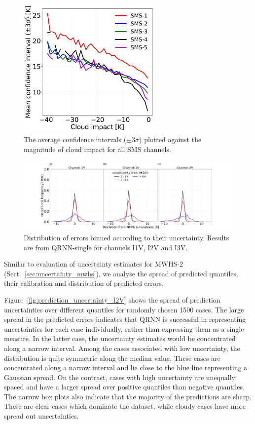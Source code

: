\documentclass[amt, manuscript]{copernicus}
\begin{document}
\begin{figure}[t]
	\includegraphics[width = 70mm]{Figures/fig12.pdf}	
	\caption{The average confidence intervals ($\pm3\sigma$) plotted against the magnitude of cloud impact for all SMS channels.}
	\label{fig:uncertainty_cloud_impact}	
\end{figure}
\begin{figure}[t]
	\includegraphics[width=\textwidth]{Figures/fig13.pdf}	
	\caption{Distribution of errors binned according to their uncertainty. Results are from QRNN-single for channels I1V, I2V and I3V.}
	\label{fig:error_distribution_uncertainty_bins}	
\end{figure}

Similar to evaluation of uncertainty estimates for MWHS-2 (Sect.~\ref{sec:uncertainty_mwhs}), we analyse the spread of predicted quantiles, their calibration and distribution of predicted errors. 

Figure~\ref{fig:prediction_uncertainty_I2V} shows the spread of prediction uncertainties over different quantiles for randomly chosen 1500 cases. The large spread in the predicted errors indicates that QRNN is successful in representing uncertainties for each case individually, rather than expressing them as a single measure. In the latter case, the uncertainty estimates would be concentrated along a narrow interval. Among the cases associated with low uncertainty, the distribution is quite symmetric along the median value. These cases are concentrated along a narrow interval and lie close to the blue line representing a Gaussian spread. On the contrast, cases with high uncertainty are unequally spaced and have a larger spread over positive quantiles than negative quantiles. The narrow box plots also indicate that the majority of the predictions are sharp. These are clear-cases which dominate the dataset, while cloudy cases have more spread out uncertainties. 
\end{document}
